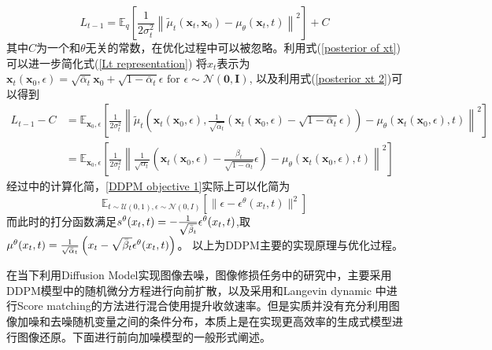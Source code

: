 \begin{equation}
    L_{t-1}=\mathbb{E}_q\left[\frac{1}{2 \sigma_t^2}\left\|\tilde{{\mu}}_t\left(\mathbf{x}_t, \mathbf{x}_0\right)-{\mu}_\theta\left(\mathbf{x}_t, t\right)\right\|^2\right]+C
    \label{Lt representation}
\end{equation}
其中$C$为一个和$\theta$无关的常数，在优化过程中可以被忽略。利用式(\ref{posterior of xt})可以进一步简化式(\ref{Lt representation}) 将$x_t$表示为$\mathbf{x}_t\left(\mathbf{x}_0, {\epsilon}\right)=\sqrt{\bar{\alpha}_t} \mathbf{x}_0+\sqrt{1-\bar{\alpha}_t} {\epsilon} \text { for } {\epsilon} \sim \mathcal{N}(\mathbf{0}, \mathbf{I}) $, 以及利用式(\ref{posterior xt 2})可以得到
\begin{align}
    L_{t-1}-C&=\mathbb{E}_{\mathbf{x}_0, {\epsilon}}\left[\frac{1}{2 \sigma_t^2}\left\|\tilde{{\mu}}_t\left(\mathbf{x}_t\left(\mathbf{x}_0, {\epsilon}\right), \frac{1}{\sqrt{\bar{\alpha}_t}}\left(\mathbf{x}_t\left(\mathbf{x}_0, {\epsilon}\right)-\sqrt{1-\bar{\alpha}_t} {\epsilon}\right)\right)-{\mu}_\theta\left(\mathbf{x}_t\left(\mathbf{x}_0, {\epsilon}\right), t\right)\right\|^2\right]\\
&=\mathbb{E}_{\mathbf{x}_0, {\epsilon}}\left[\frac{1}{2 \sigma_t^2}\left\|\frac{1}{\sqrt{\alpha_t}}\left(\mathbf{x}_t\left(\mathbf{x}_0, {\epsilon}\right)-\frac{\beta_t}{\sqrt{1-\bar{\alpha}_t}} {\epsilon}\right)-{\mu}_\theta\left(\mathbf{x}_t\left(\mathbf{x}_0, {\epsilon}\right), t\right)\right\|^2\right]
\end{align}
经过\cite{DDPM,score_based_SDE}中的计算化简，\ref{DDPM objective 1}实际上可以化简为
\begin{equation}
    \mathbb{E}_{t\sim \mathcal{U}(0,1),\epsilon\sim \mathcal{N}(0,I)}\left[\|\epsilon - \epsilon^{\theta}(x_t,t)\|^2\right]
\end{equation}
而此时的打分函数满足$s^{\theta}(x_t,t) =- \frac{1}{\sqrt{\Bar{\beta}_t}}\epsilon^{\theta}(x_t,t)$,取 $\mu^{\theta}(x_t,t) = \frac{1}{\sqrt{\Bar{\alpha}_t}}\left(x_t- \sqrt{\Bar{\beta}_t}\epsilon^{\theta}(x_t,t)\right)$。 以上为DDPM主要的实现原理与优化过程。

在当下利用Diffusion Model实现图像去噪，图像修损任务中的研究中，主要采用DDPM模型中的随机微分方程进行向前扩散，以及采用和Langevin dynamic 中进行Score matching的方法进行混合使用提升收敛速率。但是实质并没有充分利用图像加噪和去噪随机变量之间的条件分布，本质上是在实现更高效率的生成式模型进行图像还原。下面进行前向加噪模型的一般形式阐述。


